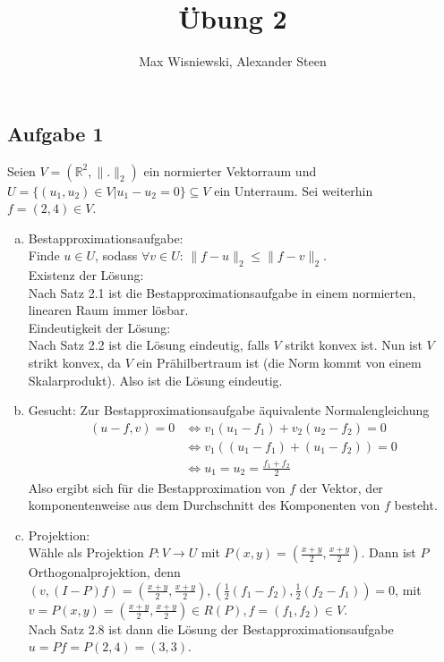 \documentclass[11pt,a4paper,ngerman]{article}
\date{}
\title{Übung 2}
\author{Max Wisniewski, Alexander Steen}
\begin{document}

\renewcommand{\figurename}{Figure}

\maketitle
\thispagestyle{fancy}


\subsection*{Aufgabe 1}
Seien $V = (\mathbb{R}^2,\| . \|_2)$ ein normierter Vektorraum und
$U = \{(u_1,u_2) \in V| u_1 - u_2 = 0 \} \subseteq V$ ein Unterraum. Sei weiterhin $f = (2,4) \in V$.

\begin{enumerate}[a)]
\item Bestapproximationsaufgabe: \\
      Finde $u \in U$, sodass $\forall v \in U: \, \|f-u\|_2 \leq \|f-v\|_2$. \\
      Existenz der Lösung: \\
      Nach Satz 2.1 ist die Bestapproximationsaufgabe in einem normierten, linearen Raum immer lösbar. \\
      Eindeutigkeit der Lösung: \\
      Nach Satz 2.2 ist die Lösung eindeutig, falls $V$ strikt konvex ist. Nun ist $V$ strikt konvex, da
      $V$ ein Prähilbertraum ist (die Norm kommt von einem Skalarprodukt). Also ist die Lösung eindeutig.
      
\item Gesucht: Zur Bestapproximationsaufgabe äquivalente Normalengleichung 
    \begin{equation*}\begin{split}
      (u-f,v) = 0 
      & \Leftrightarrow  v_1(u_1-f_1) + v_2(u_2-f_2) = 0 \\
      &\Leftrightarrow  v_1 \left( (u_1-f_1) + (u_1-f_2) \right) = 0 \\
      &\Leftrightarrow  u_1 = u_2 = \frac{f_1+f_2}{2}
    \end{split}\end{equation*}
    Also ergibt sich für die Bestapproximation von $f$ der Vektor, der komponentenweise aus dem Durchschnitt
    des Komponenten von $f$ besteht.
\item Projektion: \\
    Wähle als Projektion $P : V \to U$ mit $P(x,y) = \left(\frac{x+y}{2},\frac{x+y}{2} \right)$. Dann ist $P$ Orthogonalprojektion, denn
    $(v,(I - P) f) = \left(\frac{x+y}{2},\frac{x+y}{2} \right),\left(\frac{1}{2}(f_1-f_2),\frac{1}{2}(f_2-f_1)\right) = 0$, mit $v = P(x,y) = \left(\frac{x+y}{2},\frac{x+y}{2} \right) \in R(P), f = (f_1,f_2) \in V$. \\
    Nach Satz 2.8 ist dann die Lösung der Bestapproximationsaufgabe $u = Pf = P(2,4) = (3,3)$.

\end{enumerate}
\end{document}
